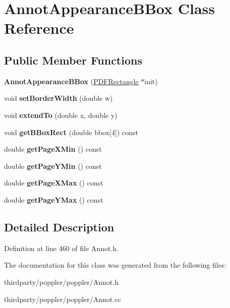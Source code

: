 \hypertarget{class_annot_appearance_b_box}{}\section{Annot\+Appearance\+B\+Box Class Reference}
\label{class_annot_appearance_b_box}
\subsection*{Public Member Functions}
\begin{DoxyCompactItemize}
\item 
\mbox{\label{class_annot_appearance_b_box_a55f777b217069d590c54984dec3e1fdb}} 
{\bfseries Annot\+Appearance\+B\+Box} (\hyperlink{class_p_d_f_rectangle}{P\+D\+F\+Rectangle} $\ast$init)
\item 
\mbox{\label{class_annot_appearance_b_box_ae5c27c6305d34377d5881b51bdf8ca23}} 
void {\bfseries set\+Border\+Width} (double w)
\item 
\mbox{\label{class_annot_appearance_b_box_ab50456464ce4d239710841a5035d27bb}} 
void {\bfseries extend\+To} (double x, double y)
\item 
\mbox{\label{class_annot_appearance_b_box_a5f8fd3457974618038bd09022a6ef8ac}} 
void {\bfseries get\+B\+Box\+Rect} (double bbox\mbox{[}4\mbox{]}) const
\item 
\mbox{\label{class_annot_appearance_b_box_a51ec0c38459e31ea3b2732e0689a59aa}} 
double {\bfseries get\+Page\+X\+Min} () const
\item 
\mbox{\label{class_annot_appearance_b_box_a9fd49f5e34dd0f6cc71b6a35b7801097}} 
double {\bfseries get\+Page\+Y\+Min} () const
\item 
\mbox{\label{class_annot_appearance_b_box_a6c54b784008df23c74efc56769aea895}} 
double {\bfseries get\+Page\+X\+Max} () const
\item 
\mbox{\label{class_annot_appearance_b_box_a00a11ee28381de40be1f9e033a004b38}} 
double {\bfseries get\+Page\+Y\+Max} () const
\end{DoxyCompactItemize}


\subsection{Detailed Description}


Definition at line 460 of file Annot.\+h.



The documentation for this class was generated from the following files\+:\begin{DoxyCompactItemize}
\item 
thirdparty/poppler/poppler/Annot.\+h\item 
thirdparty/poppler/poppler/Annot.\+cc\end{DoxyCompactItemize}
